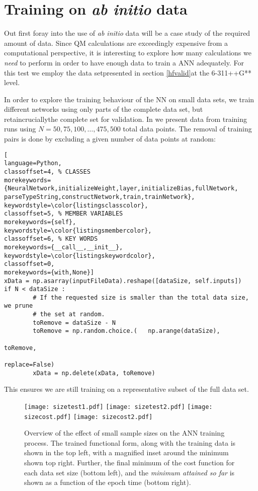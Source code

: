 \documentclass[../../master.tex]{subfiles}
\begin{document}
\newpage
\section{Training on \emph{ab initio} data}
Out first foray into the use of \emph{ab initio} data will be a case study of the required amount of data. Since QM calculations are exceedingly expensive from a computational perspective, it is interesting to explore how many calculations we \emph{need} to perform in order to have enough data to train a ANN adequately. For this test we employ the  data set\textemdash  presented in section \ref{hfvalid}\textemdash at the 6-311++G** level. 

In order to explore the training behaviour of the NN on small data sets, we train different networks using only parts of the complete data set, but retain\textemdash crucially\textemdash the complete set for validation. In  we present data from training runs using $N=50,75,100,\dots,475,500$ total data points. The removal of training pairs is done by excluding a given number of data points at random:
\begin{lstlisting}[
language=Python,
classoffset=4, % CLASSES
morekeywords={NeuralNetwork,initializeWeight,layer,initializeBias,fullNetwork, parseTypeString,constructNetwork,train,trainNetwork},
keywordstyle=\color{listingsclasscolor},
classoffset=5, % MEMBER VARIABLES
morekeywords={self},
keywordstyle=\color{listingsmembercolor},
classoffset=6, % KEY WORDS
morekeywords={__call__,__init__},
keywordstyle=\color{listingskeywordcolor},
classoffset=0,
morekeywords={with,None}]
xData = np.asarray(inputFileData).reshape([dataSize, self.inputs])
if N < dataSize :
		# If the requested size is smaller than the total data size, we prune
		# the set at random.
		toRemove = dataSize - N
		toRemove = np.random.choice.(	np.arange(dataSize), 
																	toRemove, 
																	replace=False)
		xData = np.delete(xData, toRemove)
\end{lstlisting}
This ensures we are still training on a representative subset of the full data set. 

\begin{figure}
\centering
\texttt{[image: sizetest1.pdf]}
\texttt{[image: sizetest2.pdf]}
\texttt{[image: sizecost.pdf]}
\texttt{[image: sizecost2.pdf]}
\caption{Overview of the effect of small sample sizes on the ANN training process. The trained functional form, along with the training data is shown in the top left, with a magnified inset around the minimum shown top right. Further, the final minimum of the cost function for each data set size (bottom left), and the \emph{minimum attained so far} is shown as a function of the epoch time (bottom right).\label{fig:sizes}}
\end{figure}
\end{document}
